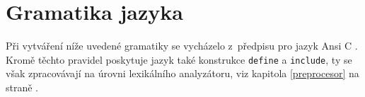 \documentclass[11pt,twoside,a4paper]{book}
\begin{document}



{
\def\CS{$\cal C\kern-0.1667em\lower.5ex\hbox{$\cal S$}\kern-0.075em $}

}



\appendix


\chapter{Gramatika jazyka}
\label{gramatika_jazyka}

Při vytváření níže uvedené gramatiky se vycházelo z~předpisu pro jazyk Ansi C \cite{c_grammar}. Kromě těchto pravidel poskytuje jazyk také konstrukce \texttt{define} a \texttt{include}, ty se však zpracovávají na úrovni lexikálního analyzátoru, viz kapitola \ref{preprocesor} na straně \pageref{preprocesor}.
\end{document}

